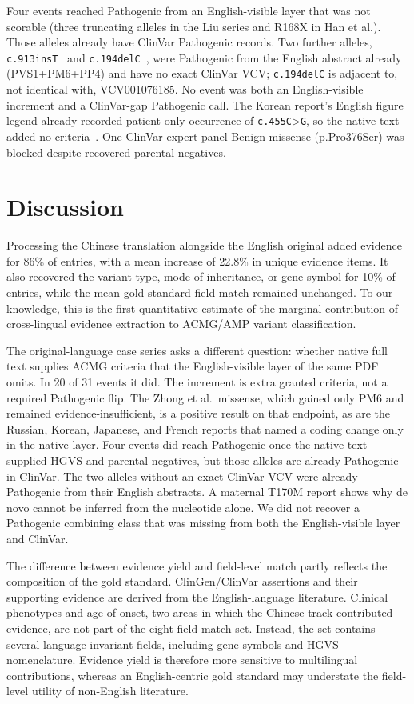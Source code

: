 \documentclass[preprint,12pt]{elsarticle}
\begin{document}
Four events reached Pathogenic from an English-visible layer that was not
scorable (three truncating alleles in the Liu series and R168X in Han et
al.). Those alleles already have ClinVar Pathogenic records. Two further
alleles, \texttt{c.913insT}~\cite{zhao2014} and
\texttt{c.194delC}~\cite{ge2018}, were Pathogenic from the English abstract
already (PVS1+PM6+PP4) and have no exact ClinVar VCV; \texttt{c.194delC} is
adjacent to, not identical with, VCV001076185. No event was both an
English-visible increment and a ClinVar-gap Pathogenic call. The Korean
report's English figure legend already recorded patient-only occurrence
of \texttt{c.455C}\textgreater\texttt{G}, so the native text added no criteria~\cite{kim2002}. One
ClinVar expert-panel Benign missense (p.Pro376Ser) was blocked despite
recovered parental negatives.

\section{Discussion}

Processing the Chinese translation alongside the English original added
evidence for 86\% of entries, with a mean increase of 22.8\% in unique
evidence items. It also recovered the variant type, mode of inheritance,
or gene symbol for 10\% of entries, while the mean gold-standard field
match remained unchanged. To our knowledge, this is the first
quantitative estimate of the marginal contribution of cross-lingual
evidence extraction to ACMG/AMP variant classification.

The original-language case series asks a different question: whether
native full text supplies ACMG criteria that the English-visible layer of
the same PDF omits. In 20 of 31 events it did. The increment is extra
granted criteria, not a required Pathogenic flip. The Zhong et al.\
missense, which gained only PM6 and remained evidence-insufficient, is a
positive result on that endpoint, as are the Russian, Korean, Japanese,
and French reports that named a coding change only in the native layer. Four events
did reach Pathogenic once the native text supplied HGVS and parental
negatives, but those alleles are already Pathogenic in ClinVar. The two
alleles without an exact ClinVar VCV were already Pathogenic from their
English abstracts. A maternal T170M report shows why de novo cannot be
inferred from the nucleotide alone. We did not recover a Pathogenic
combining class that was missing from both the English-visible layer and
ClinVar.

The difference between evidence yield and field-level match partly
reflects the composition of the gold standard. ClinGen/ClinVar assertions
and their supporting evidence are derived from the English-language
literature. Clinical phenotypes and age of onset, two areas in which the
Chinese track contributed evidence, are not part of the eight-field match
set. Instead, the set contains several language-invariant fields,
including gene symbols and HGVS nomenclature. Evidence yield is therefore
more sensitive to multilingual contributions, whereas an English-centric
gold standard may understate the field-level utility of non-English
literature.
\end{document}
